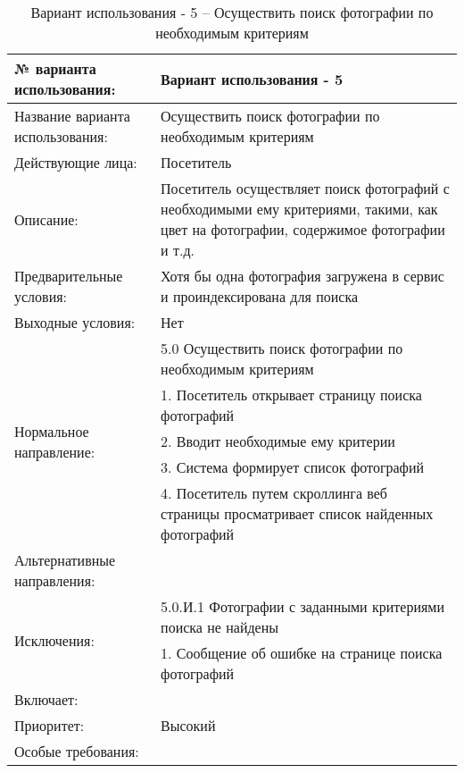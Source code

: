 \begin{table}[H]
  \caption{\onehalfspacing Вариант использования - 5 – Осуществить поиск фотографии по необходимым критериям}\label{use-case-5-table}
  \begin{tabular}{|p{6cm}|p{10cm}|}
  \hline № варианта использования: & Вариант использования - 5 \\
  \hline Название варианта использования: & Осуществить поиск фотографии по необходимым критериям \\
  \hline Действующие лица: & Посетитель \\
  \hline Описание: & Посетитель осуществляет поиск фотографий с необходимыми ему критериями, такими, как цвет на фотографии, содержимое фотографии и т.д. \\
  \hline Предварительные условия: & Хотя бы одна фотография загружена в сервис и проиндексирована для поиска \\
  \hline Выходные условия: & Нет \\
  \hline \multirow{5}{*}{Нормальное направление:} & 5.0 Осуществить поиск фотографии по необходимым критериям \\
  \cline{2-2} & 1. Посетитель открывает страницу поиска фотографий \\
  \cline{2-2} & 2. Вводит необходимые ему критерии \\
  \cline{2-2} & 3. Система формирует список фотографий \\
  \cline{2-2} & 4. Посетитель путем скроллинга веб страницы просматривает список найденных фотографий \\
  \hline Альтернативные направления: &  \\
  \hline \multirow{2}{*}{Исключения:} & 5.0.И.1 Фотографии с заданными критериями поиска не найдены \\
  \cline{2-2} & 1. Сообщение об ошибке на странице поиска фотографий \\
  \hline Включает: &  \\
  \hline Приоритет: & Высокий \\
  \hline Особые требования: &  \\
  \hline 
  \end{tabular}
\end{table}

